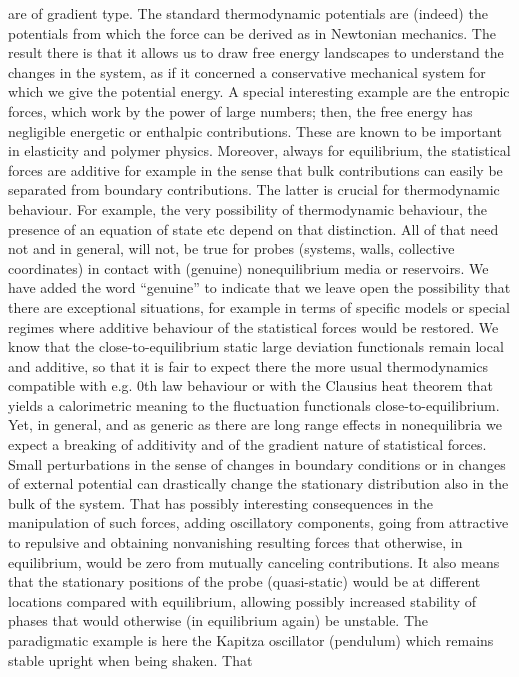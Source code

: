 are of gradient type.  The standard thermodynamic potentials are (indeed) the potentials
from which the force can be derived as in Newtonian mechanics. The result there is that it
allows us to draw free energy landscapes to understand the changes in the system, as if it
concerned a conservative mechanical system for which we give the potential energy.  A
special interesting example are the entropic forces, which work by the power of large
numbers; then, the free energy has negligible energetic or enthalpic contributions.  These
are known to be important in elasticity and polymer physics. Moreover, always for
equilibrium, the statistical forces are additive for example in the sense that bulk
contributions can easily be separated from boundary contributions.  The latter is crucial
for thermodynamic behaviour.  For example, the very possibility of thermodynamic behaviour,
the presence of an equation of state etc depend on that distinction.  All of that need not
and in general, will not,
be true for probes (systems, walls, collective coordinates) in contact with (genuine)
nonequilibrium media or reservoirs.  We have added the word “genuine” to indicate that we
leave open the possibility that there are exceptional situations, for example in terms of
specific models or special regimes where additive behaviour of the statistical forces would
be restored.  We know that the close-to-equilibrium static large deviation functionals
remain local and additive, so that it is fair to expect there the more usual thermodynamics
compatible with e.g. 0th law behaviour or with the Clausius heat theorem that yields a
calorimetric meaning to the fluctuation functionals close-to-equilibrium.  Yet, in general,
and as generic as there are long range effects in nonequilibria we expect a breaking of
additivity and of the gradient nature of statistical forces. Small perturbations in the
sense of changes in boundary conditions or in changes of external potential can drastically
change the stationary distribution also in the bulk of the system.  That has possibly
interesting consequences in the manipulation of such forces, adding oscillatory components,
going from attractive to repulsive and obtaining nonvanishing resulting forces that
otherwise, in equilibrium, would be zero from mutually canceling contributions.
%
It also means that the stationary positions of the probe (quasi-static) would be at
different locations compared with equilibrium, allowing possibly increased stability of
phases that would otherwise (in equilibrium again) be unstable.  The paradigmatic example is
here the Kapitza oscillator (pendulum) which remains stable upright when being shaken.  That
